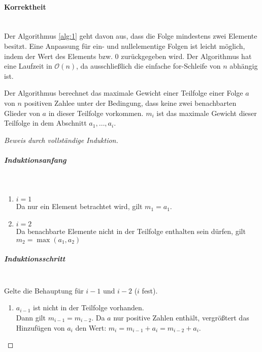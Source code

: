 \documentclass[a4paper]{scrartcl}
\begin{document}
\begin{enumerate}[(a)]
        \paragraph{Korrektheit} \hfill \\
        Der Algorithmus \ref{alg:1} geht davon aus, dass die Folge mindestens
        zwei Elemente besitzt.
        Eine Anpassung für ein- und nullelementige Folgen ist leicht möglich,
        indem der Wert des Elements bzw. 0 zurückgegeben wird.
        Der Algorithmus hat eine Laufzeit in $\mathcal{O}(n)$, da
        ausschließlich die einfache for-Schleife von $n$ abhängig ist.
        \begin{behaupt}
            Der Algorithmus berechnet das maximale Gewicht einer Teilfolge
            einer Folge $a$ von $n$ positiven Zahlee unter der Bedingung, dass
            keine zwei benachbarten Glieder von $a$ in dieser Teilfolge
            vorkommen.
            $m_i$ ist das maximale Gewicht dieser Teilfolge in dem Abschnitt
            $a_1, \ldots, a_i$.
        \end{behaupt}
        \begin{proof}[Beweis durch vollständige Induktion] \hfill \\
            \subparagraph{Induktionsanfang} \hfill \\
            \begin{enumerate}
                \item $i = 1$ \\
                    Da nur ein Element betrachtet wird, gilt $m_1 = a_1$.
                \item $i = 2$ \\
                    Da benachbarte Elemente nicht in der Teilfolge enthalten
                    sein dürfen, gilt $m_2 = \max(a_1, a_2)$
            \end{enumerate}
            \subparagraph{Induktionsschritt} \hfill \\
            Gelte die Behauptung für $i-1$ und $i-2$ ($i$ fest).

            \begin{enumerate}
                \item $a_{i-1}$ ist nicht in der Teilfolge vorhanden. \\
                    Dann gilt $m_{i-1} = m_{i-2}$.
                    Da $a$ nur positive Zahlen enthält, vergrößtert das
                    Hinzufügen von $a_i$ den Wert:
                    $m_i = m_{i-1} + a_i = m_{i-2} + a_i$.


\end{enumerate}
\end{proof}
\end{enumerate}
\end{document}
